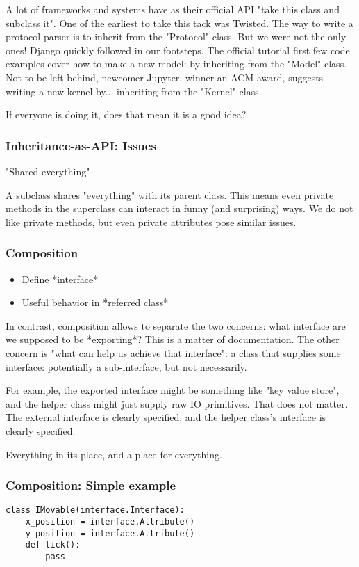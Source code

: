 A lot of frameworks and systems have as their official API
"take this class and subclass it".
One of the earliest to take this tack was Twisted.
The way to write a protocol parser is to inherit from the
"Protocol"
class.
But we were not the only ones!
Django quickly followed in our footsteps.
The official tutorial first few code examples
cover how to make a new model:
by inheriting from the
"Model"
class.
Not to be left behind,
newcomer Jupyter,
winner an ACM award,
suggests writing a new kernel
by...
inheriting from the
"Kernel"
class.

If everyone is doing it,
does that mean it is a good idea?

\begin{frame}[fragile]
\frametitle{Inheritance-as-API: Issues}

"Shared everything"
\end{frame}

A subclass shares
"everything"
with its parent class.
This means even private methods in the superclass
can interact in funny
(and surprising)
ways.
We do not like private methods,
but even private attributes pose similar issues.

\begin{frame}[fragile]
\frametitle{Composition}

\begin{itemize}
\item Define *interface*
\item Useful behavior in *referred class*
\end{itemize}

\end{frame}

In contrast,
composition allows to separate the two concerns:
what interface are we supposed to be *exporting*?
This is a matter of documentation.
The other concern is
"what can help us achieve that interface":
a class that supplies some interface:
potentially a sub-interface,
but not necessarily.

For example,
the exported interface might be something like
"key value store",
and the helper class might just supply raw IO primitives.
That does not matter.
The external interface is clearly specified,
and the helper class's interface is clearly specified.

Everything in its place,
and a place for everything.

\begin{frame}[fragile]
\frametitle{Composition: Simple example}
\begin{lstlisting}
class IMovable(interface.Interface):
    x_position = interface.Attribute()
    y_position = interface.Attribute()
    def tick():
        pass
\end{lstlisting}

\end{frame}

